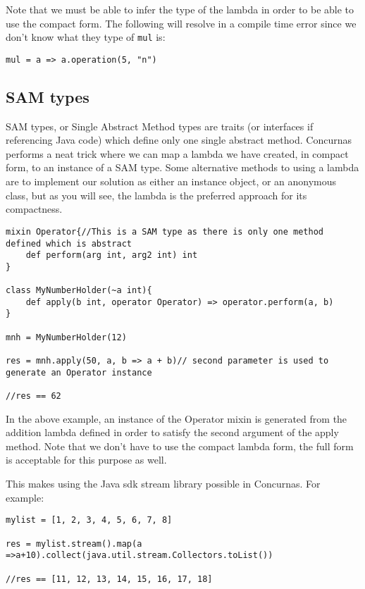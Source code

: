 \documentclass[conc-doc]{subfiles}
\begin{document}
Note that we must be able to infer the type of the lambda in order to be able to use the compact form. The following will resolve in a compile time error since we don't know what they type of \lstinline{mul} is:
\begin{lstlisting}
mul = a => a.operation(5, "n")
\end{lstlisting}

\subsection{SAM types}
SAM types, or Single Abstract Method types are traits (or interfaces if referencing Java code) which define only one single abstract method. Concurnas performs a neat trick where we can map a lambda we have created, in compact form, to an instance of a SAM type. Some alternative methods to using a lambda are to implement our solution as either an instance object, or an anonymous class, but as you will see, the lambda is the preferred approach for its compactness.

\begin{lstlisting}
mixin Operator{//This is a SAM type as there is only one method defined which is abstract 
	def perform(arg int, arg2 int) int
}

class MyNumberHolder(~a int){
	def apply(b int, operator Operator) => operator.perform(a, b)
}

mnh = MyNumberHolder(12)

res = mnh.apply(50, a, b => a + b)// second parameter is used to generate an Operator instance

//res == 62
\end{lstlisting}

In the above example, an instance of the Operator mixin is generated from the addition lambda defined in order to satisfy the second argument of the apply method. Note that we don't have to use the compact lambda form, the full form is acceptable for this purpose as well.

This makes using the Java sdk stream library possible in Concurnas. For example:

\begin{lstlisting}
mylist = [1, 2, 3, 4, 5, 6, 7, 8]

res = mylist.stream().map(a =>a+10).collect(java.util.stream.Collectors.toList())

//res == [11, 12, 13, 14, 15, 16, 17, 18]
\end{lstlisting}
\end{document}
